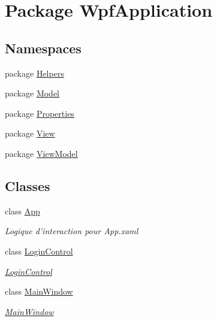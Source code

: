 \hypertarget{namespace_wpf_application}{\section{Package Wpf\-Application}
\label{namespace_wpf_application}
}
\subsection*{Namespaces}
\begin{DoxyCompactItemize}
\item 
package \hyperlink{namespace_wpf_application_1_1_helpers}{Helpers}
\item 
package \hyperlink{namespace_wpf_application_1_1_model}{Model}
\item 
package \hyperlink{namespace_wpf_application_1_1_properties}{Properties}
\item 
package \hyperlink{namespace_wpf_application_1_1_view}{View}
\item 
package \hyperlink{namespace_wpf_application_1_1_view_model}{View\-Model}
\end{DoxyCompactItemize}
\subsection*{Classes}
\begin{DoxyCompactItemize}
\item 
class \hyperlink{class_wpf_application_1_1_app}{App}
\begin{DoxyCompactList}\small\item\em Logique d'interaction pour App.\-xaml \end{DoxyCompactList}\item 
class \hyperlink{class_wpf_application_1_1_login_control}{Login\-Control}
\begin{DoxyCompactList}\small\item\em \hyperlink{class_wpf_application_1_1_login_control}{Login\-Control} \end{DoxyCompactList}\item 
class \hyperlink{class_wpf_application_1_1_main_window}{Main\-Window}
\begin{DoxyCompactList}\small\item\em \hyperlink{class_wpf_application_1_1_main_window}{Main\-Window} \end{DoxyCompactList}\end{DoxyCompactItemize}
